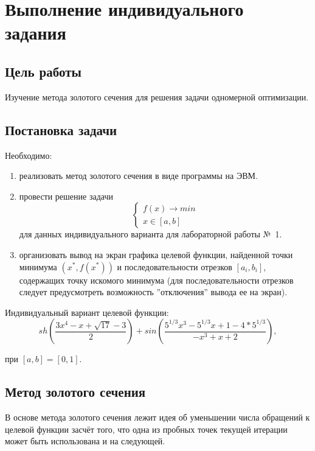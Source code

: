 \chapter{Выполнение индивидуального задания}

\section{Цель работы}

Изучение метода золотого сечения для решения задачи одномерной оптимизации.

\section{Постановка задачи}

Необходимо:
\begin{enumerate}
\item реализовать метод золотого сечения в виде программы на ЭВМ.
\item провести решение задачи
\begin{equation*}
\begin{cases}
f(x) \rightarrow min \\
x \in [a, b]
\end{cases}
\end{equation*}
для данных индивидуального варианта для лабораторной работы №~1.
\item организовать вывод на экран графика целевой функции, найденной точки минимума $(x^* , f (x^*))$ и последовательности отрезков $[a_i, b_i]$, содержащих точку искомого минимума (для последовательности отрезков следует предусмотреть возможность ”отключения” вывода ее на экран).
\end{enumerate}

Индивидуальный вариант целевой функции:
\begin{equation*}
sh(\frac{3x^4 - x + \sqrt{17} - 3}{2})+sin(\frac{5^{1/3}x^3 - 5^{1/3}x + 1 - 4*5^{1/3}}{-x^3 + x + 2}),
\end{equation*}

при $[a, b] = [0, 1]$.

\section*{Метод золотого сечения}

В основе метода золотого сечения лежит идея об уменьшении числа обращений к целевой функции засчёт того, что одна из пробных точек текущей итерации может быть использована и на следующей.

